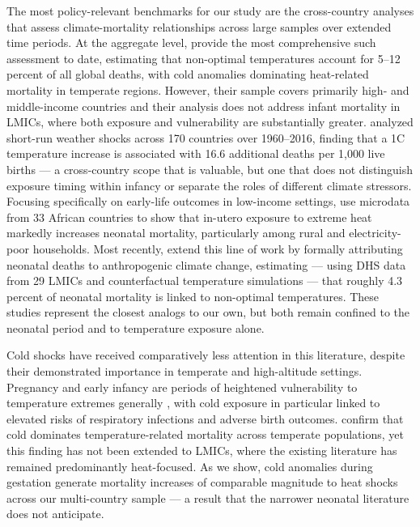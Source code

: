\documentclass[a4paper]{article}
\begin{document}
The most policy-relevant benchmarks for our study are the cross-country analyses that assess climate-mortality relationships across large samples over extended time periods. At the aggregate level, \textcite{burke2025} provide the most comprehensive such assessment to date, estimating that non-optimal temperatures account for 5--12 percent of all global deaths, with cold anomalies dominating heat-related mortality in temperate regions. However, their sample covers primarily high- and middle-income countries and their analysis does not address infant mortality in LMICs, where both exposure and vulnerability are substantially greater. \textcite{meierrieks2021} analyzed short-run weather shocks across 170 countries over 1960--2016, finding that a 1\textdegree C temperature increase is associated with 16.6 additional deaths per 1,000 live births — a cross-country scope that is valuable, but one that does not distinguish exposure timing within infancy or separate the roles of different climate stressors. Focusing specifically on early-life outcomes in low-income settings, \textcite{wang2025} use microdata from 33 African countries to show that in-utero exposure to extreme heat markedly increases neonatal mortality, particularly among rural and electricity-poor households. Most recently, \textcite{dimitrova2024} extend this line of work by formally attributing neonatal deaths to anthropogenic climate change, estimating — using DHS data from 29 LMICs and counterfactual temperature simulations — that roughly 4.3 percent of neonatal mortality is linked to non-optimal temperatures. These studies represent the closest analogs to our own, but both remain confined to the neonatal period and to temperature exposure alone.

Cold shocks have received comparatively less attention in this literature, despite their demonstrated importance in temperate and high-altitude settings. Pregnancy and early infancy are periods of heightened vulnerability to temperature extremes generally \parencite{strand2012,kuehn2017}, with cold exposure in particular linked to elevated risks of respiratory infections and adverse birth outcomes. \textcite{burke2025} confirm that cold dominates temperature-related mortality across temperate populations, yet this finding has not been extended to LMICs, where the existing literature has remained predominantly heat-focused. As we show, cold anomalies during gestation generate mortality increases of comparable magnitude to heat shocks across our multi-country sample — a result that the narrower neonatal literature does not anticipate.
\end{document}
